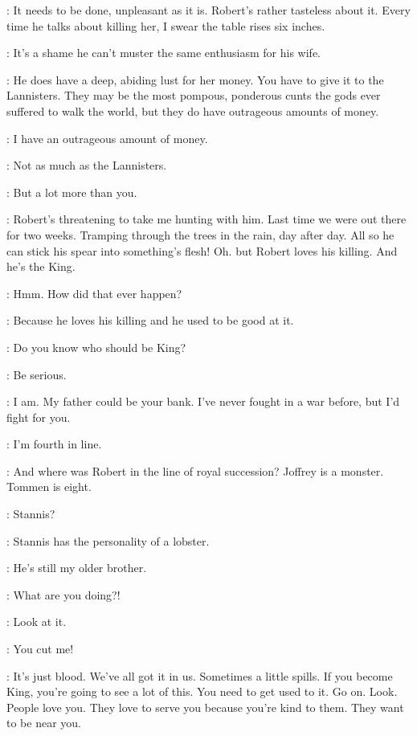 \RENLY: It needs to be done, unpleasant as it is. Robert's rather tasteless about it. Every time he talks about killing her, I swear the table rises six inches. 

\LORAS: It's a shame he can't muster the same enthusiasm for his wife. 

\RENLY: He does have a deep, abiding lust for her money. You have to give it to the Lannisters. They may be the most pompous, ponderous cunts the gods ever suffered to walk the world, but they do have outrageous amounts of money. 

\LORAS: I have an outrageous amount of money. 

\RENLY: Not as much as the Lannisters. 

\LORAS: But a lot more than you. 

\RENLY: Robert's threatening to take me hunting with him. Last time we were out there for two weeks.  Tramping through the trees in the rain, day after day. All so he can stick his spear into something's flesh! Oh. but Robert loves his killing. And he's the King. 

\LORAS: Hmm.  How did that ever happen? 

\RENLY: Because he loves his killing and he used to be good at it. 

\LORAS: Do you know who should be King? 

\RENLY: Be serious. 

\LORAS: I am. My father could be your bank. I've never fought in a war before, but I'd fight for you. 

\RENLY: I'm fourth in line. 

\LORAS: And where was Robert in the line of royal succession? Joffrey is a monster. Tommen is eight. 

\RENLY: Stannis? 

\LORAS: Stannis has the personality of a lobster. 

\RENLY: He's still my older brother. 


\RENLY: What are you doing?! 

\LORAS: Look at it. 

\RENLY: You cut me! 

\LORAS: It's just blood. We've all got it in us. Sometimes a little spills. If you become King, you're going to see a lot of this. You need to get used to it. Go on. Look. People love you. They love to serve you because you're kind to them. They want to be near you. 

